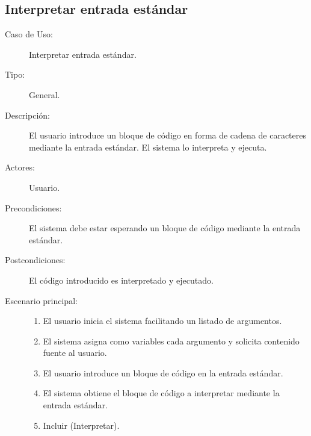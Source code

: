 \subsection{Interpretar entrada estándar}
\begin{framed}
\begin{description}
  \item[Caso de Uso:] 
  Interpretar entrada estándar.
  \item[Tipo:] General.
  \item[Descripción:] 
  El usuario introduce un bloque de código en forma de cadena de 
  caracteres mediante la entrada estándar. El sistema lo interpreta 
  y ejecuta.
  \item[Actores:] 
  Usuario.
  \item[Precondiciones:] 
  El sistema debe estar esperando un bloque de código mediante la entrada estándar.
  \item[Postcondiciones:] 
  El código introducido es interpretado y ejecutado.
  \item[Escenario principal:] \hfill 
  \begin{enumerate}
   \item El usuario inicia el sistema facilitando un listado de argumentos.
   \item El sistema asigna como variables cada argumento y solicita contenido fuente al usuario. 
   \item El usuario introduce un bloque de código en la entrada estándar.
   \item El sistema obtiene el bloque de código a interpretar mediante la entrada estándar.
   \item Incluir (Interpretar). 
  \end{enumerate}
\end{description}
\end{framed}
